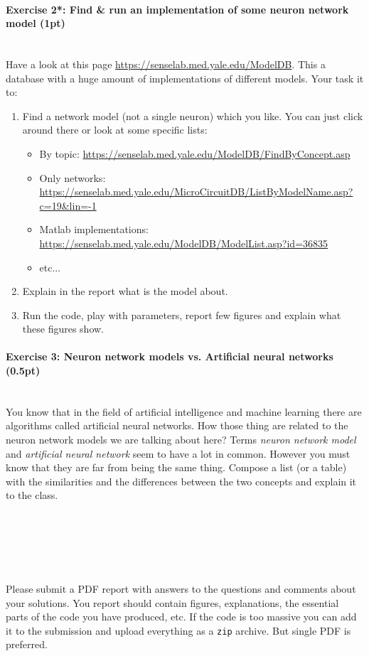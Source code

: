 \documentclass[a4paper,11pt]{article}
\newenvironment{exercise}[3]{\paragraph{Exercise #1: #2 (#3pt)}\ \\}{
\medskip}
\begin{document}
%
%
\begin{exercise}{2*}{Find \& run an implementation of some neuron network model}{1}
Have a look at this page \url{https://senselab.med.yale.edu/ModelDB}. This a database with a huge amount of implementations of different models. Your task it to:
\begin{enumerate}[label=\alph*)]
	\item Find a network model (not a single neuron) which you like. You can just click around there or look at some specific lists:
		\begin{itemize}
			\item By topic: \url{https://senselab.med.yale.edu/ModelDB/FindByConcept.asp}
			\item Only networks: \url{https://senselab.med.yale.edu/MicroCircuitDB/ListByModelName.asp?c=19&lin=-1}
			\item Matlab implementations: \url{https://senselab.med.yale.edu/ModelDB/ModelList.asp?id=36835}
			\item etc...
		\end{itemize}
	\item Explain in the report what is the model about.
	\item Run the code, play with parameters, report few figures and explain what these figures show.
\end{enumerate}
\end{exercise}


%
%
\begin{exercise}{3}{Neuron network models vs. Artificial neural networks}{0.5}
You know that in the field of artificial intelligence and machine learning there are algorithms called artificial neural networks. How those thing are related to the neuron network models we are talking about here? Terms \emph{neuron network model} and \emph{artificial neural network} seem to have a lot in common. However you must know that they are far from being the same thing. Compose a list (or a table) with the similarities and the differences between the two concepts and explain it to the class.
\end{exercise}



\ \\
\ \\
\ \\
\ \\
\ \\
Please submit a PDF report with answers to the questions and comments about your solutions. You report should contain figures, explanations, the essential parts of the code you have produced, etc. If the code is too massive you can add it to the submission and upload everything as a \texttt{zip} archive. But single PDF is preferred.
\end{document}
